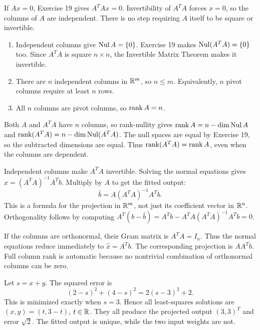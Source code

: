 If $Ax=0$, Exercise 19 gives $A^TAx=0$. Invertibility of
$A^TA$ forces $x=0$, so the columns of $A$ are independent.
There is no step requiring $A$ itself to be square or invertible.

\begin{enumerate}[label=(\alph*)]
\item Independent columns give $\operatorname{Nul} A=\{0\}$. Exercise 19 makes
$\operatorname{Nul}(A^TA)=\{0\}$ too. Since $A^TA$ is square $n\times n$,
the Invertible Matrix Theorem makes it invertible.
\item There are $n$ independent columns in $\mathbb{R}^m$, so $n\le m$.
Equivalently, $n$ pivot columns require at least $n$ rows.
\item All $n$ columns are pivot columns, so $\operatorname{rank} A=n$.
\end{enumerate}

Both $A$ and $A^TA$ have $n$ columns, so rank-nullity gives
$\operatorname{rank} A=n-\dim\operatorname{Nul} A$ and
$\operatorname{rank}(A^TA)=n-\dim\operatorname{Nul}(A^TA)$.
The null spaces are equal by Exercise 19, so the subtracted dimensions
are equal. Thus $\operatorname{rank}(A^TA)=\operatorname{rank} A$, even when the columns are dependent.

Independent columns make $A^TA$ invertible. Solving the normal
equations gives $\widehat x=(A^TA)^{-1}A^Tb$. Multiply by $A$
to get the fitted output:
\[
 \boxed{\widehat b=A(A^TA)^{-1}A^Tb}.
\]
This is a formula for the projection in $\mathbb{R}^m$, not just its
coefficient vector in $\mathbb{R}^n$. Orthogonality follows by computing
$A^T(b-\widehat b)=A^Tb-A^TA(A^TA)^{-1}A^Tb=0$.

If the columns are orthonormal, their Gram matrix is $A^TA=I_n$.
Thus the normal equations reduce immediately to
$\boxed{\widehat x=A^Tb}$. The corresponding projection is
$AA^Tb$. Full column rank is automatic because no nontrivial
combination of orthonormal columns can be zero.

Let $s=x+y$. The squared error is
\[
 (2-s)^2+(4-s)^2=2(s-3)^2+2.
\]
This is minimized exactly when $s=3$. Hence all least-squares
solutions are $(x,y)=(t,3-t)$, $t\in\mathbb{R}$.
They all produce the projected output $(3,3)^T$ and error $\sqrt2$.
The fitted output is unique, while the two input weights are not.

